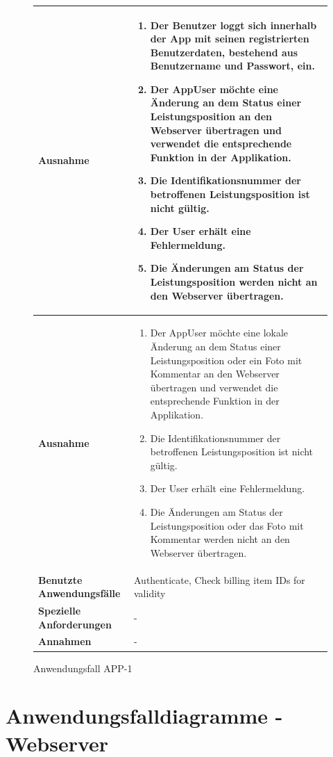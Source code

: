 			\begin{figure}[h]
	\centering
	\begin{tabularx}{\textwidth}{ X | X }
		\textbf{Ausnahme} &
				\begin{enumerate}
				\item Der Benutzer loggt sich innerhalb der App mit seinen registrierten Benutzerdaten, bestehend aus Benutzername und Passwort,  ein.  
					 \item Der AppUser m\"ochte eine \"Anderung an dem Status einer Leistungsposition an den Webserver \"ubertragen und verwendet die entsprechende Funktion in der Applikation. 
					 \item Die Identifikationsnummer der betroffenen Leistungsposition ist nicht g\"ultig.
					 \item Der User erh\"alt eine Fehlermeldung.
					 \item Die \"Anderungen am Status der Leistungsposition werden nicht an den Webserver \"ubertragen.
				\end{enumerate} \\ \hline
						\textbf{Ausnahme} &
				\begin{enumerate}
					 \item Der AppUser m\"ochte eine lokale \"Anderung an dem Status einer Leistungsposition oder ein Foto mit Kommentar an den Webserver \"ubertragen und verwendet die entsprechende Funktion in der Applikation. 
					 \item Die Identifikationsnummer der betroffenen Leistungsposition ist nicht g\"ultig.
					 \item Der User erh\"alt eine Fehlermeldung.
					 \item Die \"Anderungen am Status der Leistungsposition oder das Foto mit Kommentar werden nicht an den Webserver \"ubertragen.
				\end{enumerate} \\ \hline
		\textbf{Benutzte Anwendungsfälle} & Authenticate,  Check billing item IDs for validity\\ \hline
		\textbf{Spezielle Anforderungen} & - \\ \hline
		\textbf{Annahmen} & -
	\end{tabularx}
	\caption{Anwendungsfall APP-1}
	\label{fig:anwendungsfall-app-tabelle-APP-1-4}
\end{figure}

\clearpage

\section{Anwendungsfalldiagramme - Webserver}

